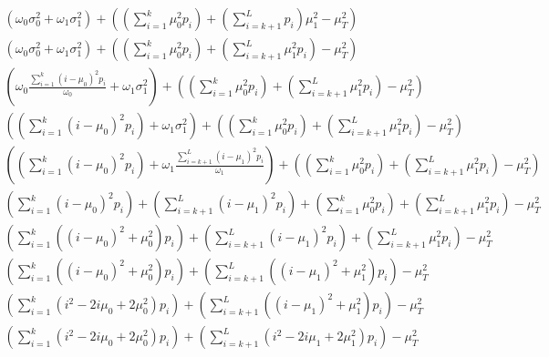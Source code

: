 \documentclass[12pt, a4paper]{report}
\begin{document}
\begin{eqnarray}
	\left( \omega_0 \sigma_0^2 + \omega_1 \sigma_1^2 \right) + \left( \left( \sum_{i = 1}^{k} \mu_0^2 p_i \right) + \left( \sum_{i = k + 1}^{L} p_i \right)  \mu_1^2 - \mu_T^2 \right)\\
	\left( \omega_0 \sigma_0^2 + \omega_1 \sigma_1^2 \right) + \left( \left( \sum_{i = 1}^{k} \mu_0^2 p_i \right) + \left( \sum_{i = k + 1}^{L} \mu_1^2 p_i \right) - \mu_T^2 \right)\\
	\left( \omega_0 \frac{\sum_{i = 1}^k \left( i - \mu_0 \right)^2 p_i}{\omega_0} + \omega_1 \sigma_1^2 \right) + \left( \left( \sum_{i = 1}^{k} \mu_0^2 p_i \right) + \left( \sum_{i = k + 1}^{L} \mu_1^2 p_i \right) - \mu_T^2 \right)\\
	\left( \left( \sum_{i = 1}^k \left( i - \mu_0 \right)^2 p_i \right) + \omega_1 \sigma_1^2 \right) + 	\left( \left( \sum_{i = 1}^{k} \mu_0^2 p_i \right) + \left( \sum_{i = k + 1}^{L} \mu_1^2 p_i \right) - \mu_T^2 \right)\\
	\left( \left( \sum_{i = 1}^k \left( i - \mu_0 \right)^2 p_i \right) + \omega_1 \frac{\sum_{i = k + 1}^L \left( i - \mu_1 \right)^2 p_i}{\omega_1} \right) + 	\left( \left( \sum_{i = 1}^{k} \mu_0^2 p_i \right) + \left( \sum_{i = k + 1}^{L} \mu_1^2 p_i \right) - \mu_T^2 \right)\\
	\left( \sum_{i = 1}^k \left( i - \mu_0 \right)^2 p_i \right) + \left( \sum_{i = k + 1}^L \left( i - \mu_1 \right)^2 p_i\right)  + 	 \left( \sum_{i = 1}^{k} \mu_0^2 p_i \right) + \left( \sum_{i = k + 1}^{L} \mu_1^2 p_i \right) - \mu_T^2 \\
	\left( \sum_{i = 1}^k \left( \left( i - \mu_0 \right)^2 + \mu_0^2 \right) p_i \right) + \left( \sum_{i = k + 1}^L \left( i - \mu_1 \right)^2 p_i\right)  + \left( \sum_{i = k + 1}^{L} \mu_1^2 p_i \right) - \mu_T^2 \\
	\left( \sum_{i = 1}^k \left( \left( i - \mu_0 \right)^2 + \mu_0^2 \right) p_i \right) + \left( \sum_{i = k + 1}^L \left( \left( i - \mu_1 \right)^2 + \mu_1^2 \right) p_i\right) - \mu_T^2 \\
	\left( \sum_{i = 1}^k \left( i^2 - 2 i \mu_0 + 2 \mu_0^2 \right) p_i \right) + \left( \sum_{i = k + 1}^L \left( \left( i - \mu_1 \right)^2 + \mu_1^2 \right) p_i\right) - \mu_T^2 \\
	\left( \sum_{i = 1}^k \left( i^2 - 2 i \mu_0 + 2 \mu_0^2 \right) p_i \right) + \left( \sum_{i = k + 1}^L \left( i^2 - 2 i \mu_1 + 2 \mu_1^2 \right) p_i \right) - \mu_T^2
\end{eqnarray}
\end{document}
